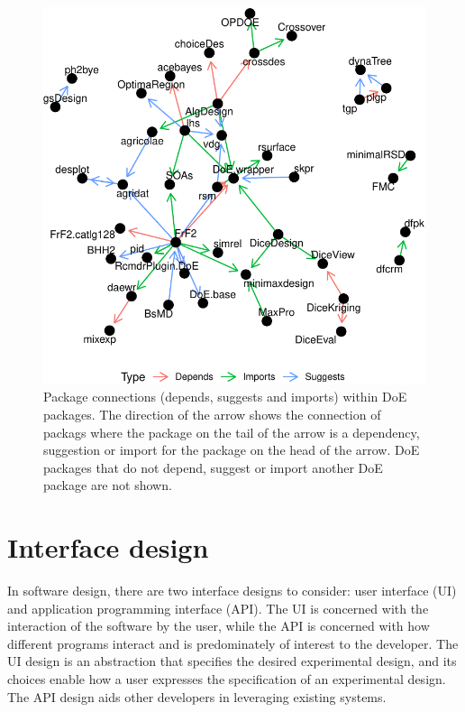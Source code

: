 \documentclass{article}
\begin{document}
\begin{figure}[htbp]

{\centering \includegraphics{figures/plot-doe-network-1} 

}

\caption{Package connections (depends, suggests and imports) within DoE packages. The direction of the arrow shows the connection of packags where the package on the tail of the arrow is a dependency, suggestion or import for the package on the head of the arrow.  DoE packages that do not depend, suggest or import another DoE package are not shown.}\label{fig:plot-doe-network}
\end{figure}

\hypertarget{design}{%
\section{Interface design}\label{design}}

In software design, there are two interface designs to consider: user
interface (UI) and application programming interface (API). The UI is
concerned with the interaction of the software by the user, while the
API is concerned with how different programs interact and is
predominately of interest to the developer. The UI design is an
abstraction that specifies the desired experimental design, and its
choices enable how a user expresses the specification of an experimental
design. The API design aids other developers in leveraging existing
systems.
\end{document}
